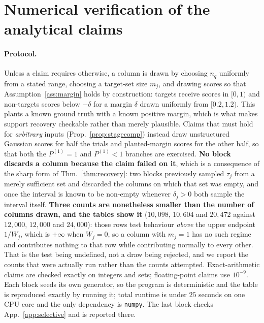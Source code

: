 \documentclass{article}
\begin{document}
\section{Numerical verification of the analytical claims}
\label{app:numerics}

\paragraph{Protocol.} Unless a claim requires otherwise, a column is drawn by choosing $n_q$
uniformly from a stated range, choosing a target-set size $m_j$, and drawing scores so that
Assumption~\ref{ass:margin} holds by construction: targets receive scores in $[0,1)$ and
non-targets scores below $-\delta$ for a margin $\delta$ drawn uniformly from $[0.2,1.2)$. This
plants a known ground truth with a known positive margin, which is what makes support recovery
checkable rather than merely plausible. Claims that must hold for \emph{arbitrary} inputs
(Prop.~\ref{prop:stagecomp}) instead draw unstructured Gaussian scores for half the trials and
planted-margin scores for the other half, so that both the $P^{(1)}=1$ and $P^{(1)}<1$ branches
are exercised. \textbf{No block discards a column because the claim failed on it}, which is a
consequence of the sharp form of Thm.~\ref{thm:recovery}: two blocks previously sampled $\tau_j$
from a merely sufficient set and discarded the columns on which that set was empty, and once the
interval is known to be non-empty whenever $\delta_j>0$ both sample the interval itself.
\textbf{Three counts are nonetheless smaller than the number of columns drawn, and the tables show
it} ($10{,}098$, $10{,}604$ and $20{,}472$ against $12{,}000$, $12{,}000$ and $24{,}000$): those
rows test behaviour \emph{above} the upper endpoint $1/W_j$, which is $+\infty$ when $W_j=0$, so
a column with $m_j=1$ has no such regime and contributes nothing to that row while contributing
normally to every other. That is the test being undefined, not a draw being rejected, and we
report the counts that were actually run rather than the counts attempted. Exact-arithmetic claims
are checked exactly on integers and sets; floating-point claims use $10^{-9}$. Each block seeds
its own generator, so the program is deterministic and the table is reproduced exactly by running
it; total runtime is under $25$ seconds on one CPU core and the only dependency is
\texttt{numpy}. The last block checks App.~\ref{app:selective} and is reported there.
\end{document}
